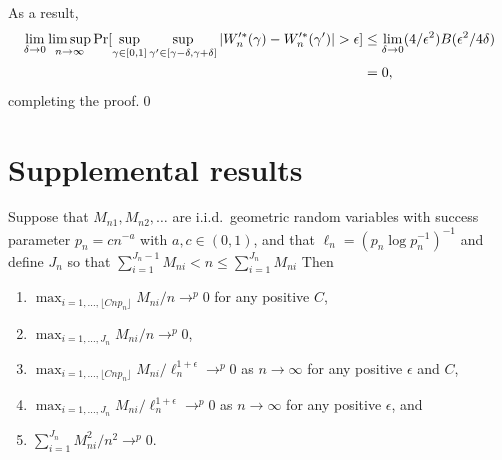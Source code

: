 \documentclass[11pt]{article}
\begin{document}
As a result,
\begin{align*}
  \lim_{\delta \to 0} \limsup_{n\to\infty} \operatorname{Pr}[\sup_{\gamma \in [0,1]}
  \sup_{\gamma' \in [\gamma - \delta, \gamma + \delta]}
  | W_n^{\prime *}(\gamma) - W_n^{\prime *}(\gamma') | > \epsilon] & \leq
  \lim_{\delta \to 0} (4/\epsilon^2)
  B(\epsilon^2/4\delta) \\
  &= 0,
\end{align*}
completing the proof.\qed

\section{Supplemental results}

\begin{lem}\label{block-length-convergence-lemma}
  Suppose that $M_{n1}, M_{n2},\dots$ are i.i.d.\ geometric random
  variables with success parameter $p_n = c n^{-a}$ with $a, c \in
  (0,1)$, and that $\ell_n = (p_n \log p_n^{-1})^{-1}$ and define
  $J_n$ so that $\sum_{i=1}^{J_n-1} M_{ni} < n \leq \sum_{i=1}^{J_n} M_{ni} $
  Then
  \begin{enumerate}
  \item $\max_{i=1,\dots,\lfloor C n p_n \rfloor} M_{ni} / n \to^p 0$
    for any positive $C$,
  \item $\max_{i=1,\dots,J_n} M_{ni} / n \to^p 0$,
  \item $\max_{i=1,\dots,  \lfloor C n p_n \rfloor} M_{ni} /
  \ell_n^{1+\epsilon} \to^p 0$ as $n \to \infty$ for any positive
  $\epsilon$ and $C$,
  \item $\max_{i=1,\dots,J_n} M_{ni} /
  \ell_n^{1+\epsilon} \to^p 0$ as $n \to \infty$ for any positive
  $\epsilon$, and
  \item $\sum_{i=1}^{J_n} M_{ni}^2 / n^2 \to^p 0$.
  \end{enumerate}
\end{lem}
\end{document}

